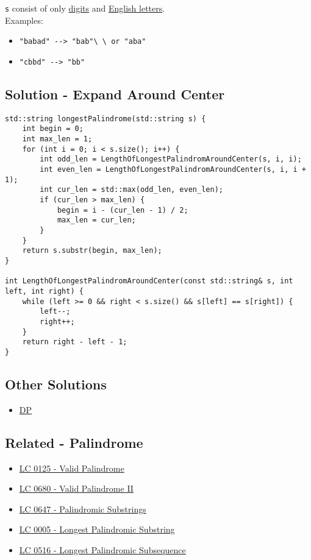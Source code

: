 {{\colorbox{CodeBackground}{\lstinline|s|}} consist of only \ul{digits} and \ul{English letters}.\\

Examples:
\begin{itemize}
	\item {\colorbox{CodeBackground}{\lstinline|"babad" --> "bab"\ \ or "aba"|}}
	\item {\colorbox{CodeBackground}{\lstinline|"cbbd" --> "bb"|}}
\end{itemize}

\subsection*{Solution - Expand Around Center}\label{solution:lc0005_expand_around_center}
\begin{lstlisting}
std::string longestPalindrome(std::string s) {
	int begin = 0;
	int max_len = 1;
	for (int i = 0; i < s.size(); i++) {
		int odd_len = LengthOfLongestPalindromAroundCenter(s, i, i);
		int even_len = LengthOfLongestPalindromAroundCenter(s, i, i + 1);
		int cur_len = std::max(odd_len, even_len);
		if (cur_len > max_len) {
			begin = i - (cur_len - 1) / 2;
			max_len = cur_len;
		}
	}
	return s.substr(begin, max_len);
}

int LengthOfLongestPalindromAroundCenter(const std::string& s, int left, int right) {
	while (left >= 0 && right < s.size() && s[left] == s[right]) {
		left--;
		right++;
	}
	return right - left - 1;
}
\end{lstlisting}

\subsection*{Other Solutions}
\begin{itemize}
	\item \hyperref[solution:lc0005_dp]{DP}
\end{itemize}

\subsection*{Related - Palindrome}
\begin{itemize}
	\item \hyperref[lc0125]{LC 0125 - Valid Palindrome}
 	\item \hyperref[lc0680]{LC 0680 - Valid Palindrome II}
	\item \hyperref[lc0647]{LC 0647 - Palindromic Substrings}
	\item \hyperref[lc0005]{LC 0005 - Longest Palindromic Substring}
	\item \hyperref[lc0516]{LC 0516 - Longest Palindromic Subsequence}
\end{itemize}

}
